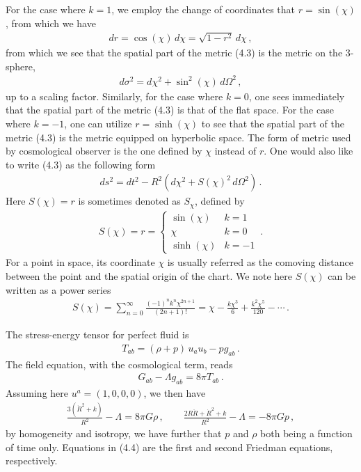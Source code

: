 \documentclass[11pt, onesided]{book}
\theoremstyle{break}
\theoremstyle{break}
\begin{document}
For the case where $k=1$, we employ the change of coordinates that $r = \sin(\chi)$, from which we have
\begin{align*}
dr = \cos(\chi) \, d\chi = \sqrt{1-r^2}\, d\chi\,,
\end{align*}
from which we see that the spatial part of the metric (4.3) is the metric on the $3$-sphere,
\begin{align*}
d\sigma^2 = d\chi^2 + \sin^2(\chi)\, d\Omega^2\,,
\end{align*}
up to a scaling factor. Similarly, for the case where $k=0$, one sees immediately that the spatial part of the metric (4.3) is that of the flat space.  For the case where $k = -1$, one can utilize $r = \sinh(\chi)$ to see that the spatial part of the metric (4.3) is the metric equipped on hyperbolic space. The form of metric used by cosmological observer is the one defined by $\chi$ instead of $r$. One would also like to write (4.3) as the following form
\begin{align*}
ds^2 = dt^2 - R^2\left( d\chi^2 + S(\chi)^2 \, d\Omega^2\right)\,.
\end{align*}
Here $S(\chi)=r$ is sometimes denoted as $S_\chi$, defined by
\begin{align*}
S(\chi)=r = \begin{cases}
\sin(\chi) & k=1\\
\chi & k=0\\
\sinh(\chi) &k=-1
\end{cases}\,. 
\end{align*}
For a point in space, its coordinate $\chi$ is usually referred as the comoving distance between the point and the spatial origin of the chart. We note here $S(\chi)$ can be written as a power series 
\begin{align*}
S(\chi) = \sum_{n=0}^\infty \frac{(-1)^{n}k^n \chi^{2n+1}}{(2n+1)!} = \chi - \frac{k\chi^3}{6} + \frac{k^2 \chi^5}{120} - \cdots\,.
\end{align*}

The stress-energy tensor for perfect fluid is
\begin{align*}
T_{ab} = (\rho+p) \, u_a u_b - pg_{ab}\,.
\end{align*}
The field equation, with the cosmological term, reads
\begin{align*}
G_{ab} - \Lambda g_{ab} = 8\pi T_{ab}\,.
\end{align*}
Assuming here $u^a= (1,0,0,0)$, we then have
\begin{align}
\frac{3(\dot{R}^2 + k)}{R^2} - \Lambda = 8\pi G\rho \,,\qquad
\frac{2R\ddot{R}+ \dot{R}^2 + k}{R^2} - \Lambda = -8\pi G p\,,
\end{align}
by homogeneity and isotropy, we have further that $p$ and $\rho$ both being a function of time only. Equations in (4.4) are the first and second Friedman equations, respectively.\\
\end{document}
